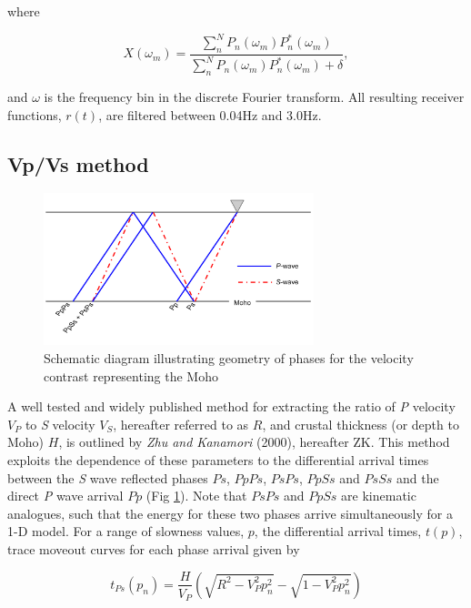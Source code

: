 \documentclass[review]{elsarticle}
\begin{document}
\noindent where

\begin{equation}
  X(\omega_m) = \frac {\sum_n^N P_n(\omega_m)P_n^*(\omega_m)} {\sum_n^N P_n(\omega_m)P_n^*(\omega_m) + \delta},
\end{equation}

\noindent and $\omega$ is the frequency bin in the discrete Fourier transform. All resulting receiver functions, $r(t)$, are filtered between 0.04Hz and 3.0Hz.



\subsection{Vp/Vs method} \label{section:VpVsMethod}

\begin{figure}
  \centering
    \includegraphics[width=0.7\textwidth]{reflectedPhases.pdf}
  \caption{Schematic diagram illustrating geometry of phases for the velocity contrast representing the Moho}
  \label{fig:reflectedPhases}
\end{figure}


A well tested and widely published method for extracting the ratio of {\it P} velocity $V_P$ to {\it S} velocity $V_S$, hereafter referred to as $R$, and crustal thickness (or depth to Moho) $H$, is outlined by {\it Zhu and Kanamori} (2000), hereafter ZK. This method exploits the dependence of these parameters to the differential arrival times between the {\it S} wave reflected phases $Ps$, $PpPs$, $PsPs$, $PpSs$ and $PsSs$ and the direct {\it P} wave arrival $Pp$ (Fig \ref{fig:reflectedPhases}). Note that $PsPs$ and $PpSs$ are kinematic analogues, such that the energy for these two phases arrive simultaneously for a 1-D model. For a range of slowness values, $p$, the differential arrival times, $t(p)$, trace moveout curves for each phase arrival given by

\begin{equation} \label{eq:tps}
t_{Ps}(p_n) = \frac{H}{V_P} \left( \sqrt{ R^2 - V_P^2p_n^2} - \sqrt{1 - V_P^2p_n^2} \right)
\end{equation}
\end{document}
